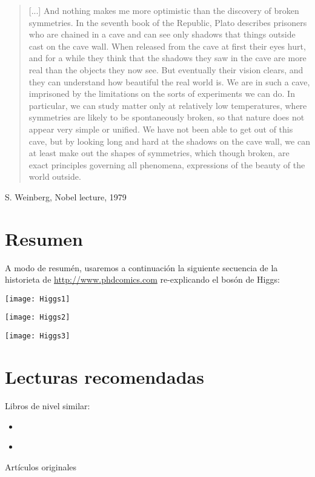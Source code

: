 \begin{quote}
[...]  And
nothing makes me more optimistic than the discovery of broken symmetries.
In the seventh book of the Republic, Plato describes prisoners who are
chained in a cave and can see only shadows that things outside cast on the
cave wall. When released from the cave at first their eyes hurt, and for a
while they think that the shadows they saw in the cave are more real than
the objects they now see. But eventually their vision clears, and they can
understand how beautiful the real world is. We are in such a cave, imprisoned
by the limitations on the sorts of experiments we can do. In particular,
we can study matter only at relatively low temperatures, where symmetries
are likely to be spontaneously broken, so that nature does not appear
very simple or unified. We have not been able to get out of this cave, but by
looking long and hard at the shadows on the cave wall, we can at least make
out the shapes of symmetries, which though broken, are exact principles
governing all phenomena, expressions of the beauty of the world outside.
\end{quote}
S. Weinberg, Nobel lecture, 1979

\section{Resumen}
A modo de resumén, usaremos a continuación la siguiente secuencia de la historieta de \url{http://www.phdcomics.com} re-explicando el bosón de Higgs:
\newpage

\texttt{[image: Higgs1]}

\texttt{[image: Higgs2]}

\texttt{[image: Higgs3]}

\newpage


\section{Lecturas recomendadas}
Libros de nivel similar:
\begin{itemize}
\item \cite{kane,cottingham,Pich:2005mk}
\item \cite{Larkoski:2019jnv,Siegel:1988yz,Nair:2018cuy,Nair:2005iw,Schwichtenberg:2018dri,Schwichtenberg20191,Schwichtenberg20192,Schwichtenberg20193,Lancaster:2014pza} %
\end{itemize}

Artículos originales

